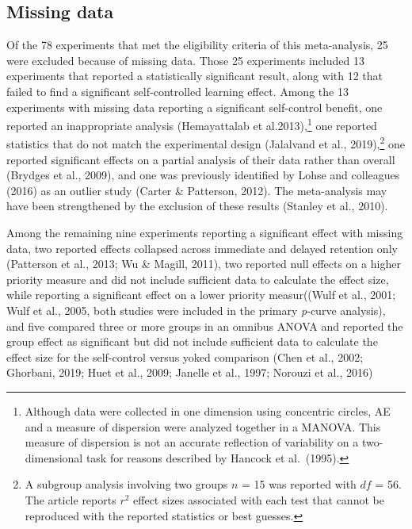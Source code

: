 \documentclass[
  english,
  man, donotrepeattitle,floatsintext]{apa7}
\begin{document}
\clearpage
\makeatletter
\efloat@restorefloats
\makeatother


\begin{appendix}
\hypertarget{missing-data}{%
\section{Missing data}\label{missing-data}}

Of the 78 experiments that met the eligibility criteria of this
meta-analysis, 25 were excluded because of missing data. Those 25
experiments included 13 experiments that reported a statistically
significant result, along with 12 that failed to find a significant
self-controlled learning effect. Among the 13 experiments with missing
data reporting a significant self-control benefit, one reported an
inappropriate analysis (Hemayattalab et al.2013),\footnote{Although data
  were collected in one dimension using concentric circles, AE and a
  measure of dispersion were analyzed together in a MANOVA. This measure
  of dispersion is not an accurate reflection of variability on a
  two-dimensional task for reasons described by Hancock et al.~(1995).}
one reported statistics that do not match the experimental design
(Jalalvand et al., 2019),\footnote{A subgroup analysis involving two
  groups \(n\) = 15 was reported with \(df\) = 56. The article reports
  \(r^2\) effect sizes associated with each test that cannot be
  reproduced with the reported statistics or best guesses.} one reported
significant effects on a partial analysis of their data rather than
overall (Brydges et al., 2009), and one was previously identified by
Lohse and colleagues (2016) as an outlier study (Carter \& Patterson,
2012). The meta-analysis may have been strengthened by the exclusion of
these results (Stanley et al., 2010).

Among the remaining nine experiments reporting a significant effect with
missing data, two reported effects collapsed across immediate and
delayed retention only (Patterson et al., 2013; Wu \& Magill, 2011), two
reported null effects on a higher priority measure and did not include
sufficient data to calculate the effect size, while reporting a
significant effect on a lower priority measur((Wulf et al., 2001; Wulf
et al., 2005, both studies were included in the primary \emph{p}-curve
analysis), and five compared three or more groups in an omnibus ANOVA
and reported the group effect as significant but did not include
sufficient data to calculate the effect size for the self-control versus
yoked comparison (Chen et al., 2002; Ghorbani, 2019; Huet et al., 2009;
Janelle et al., 1997; Norouzi et al., 2016)
\end{appendix}
\end{document}
